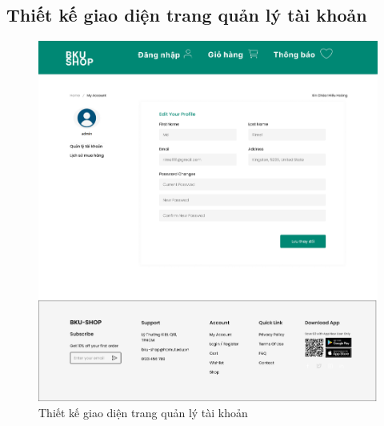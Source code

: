 \subsection {Thiết kế giao diện trang quản lý tài khoản}
\begin{figure}[H]
    \begin{center}
    \includegraphics[scale=0.3]{images/hieu/chap-4/account.jpg}
    \vspace*{5mm}
    \caption{Thiết kế giao diện trang quản lý tài khoản}
    \end{center}
\end{figure}
